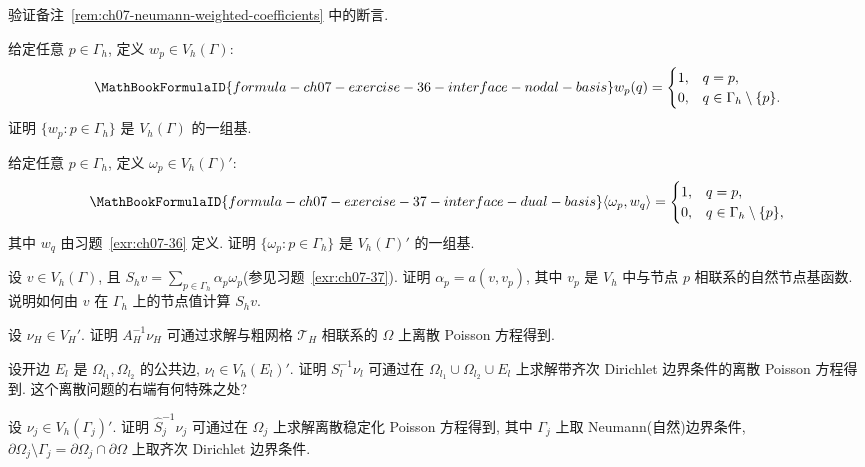 \begin{MBExercise}
\label{exr:ch07-35}
验证备注~\ref{rem:ch07-neumann-weighted-coefficients} 中的断言.
\end{MBExercise}

\begin{MBExercise}
\label{exr:ch07-36}
给定任意 $p\in\Gamma_h$, 定义 $w_p\in V_h(\Gamma)$:
\[
\MathBookFormulaID{formula-ch07-exercise-36-interface-nodal-basis}
w_p(q)=
\begin{cases}
1,&q=p,\\
0,&q\in\Gamma_h\setminus\{p\}.
\end{cases}
\]
证明 $\{w_p:p\in\Gamma_h\}$ 是 $V_h(\Gamma)$ 的一组基.
\end{MBExercise}

\begin{MBExercise}
\label{exr:ch07-37}
给定任意 $p\in\Gamma_h$, 定义 $\omega_p\in V_h(\Gamma)'$:
\[
\MathBookFormulaID{formula-ch07-exercise-37-interface-dual-basis}
\langle\omega_p,w_q\rangle=
\begin{cases}
1,&q=p,\\
0,&q\in\Gamma_h\setminus\{p\},
\end{cases}
\]
其中 $w_q$ 由习题~\ref{exr:ch07-36} 定义. 证明 $\{\omega_p:p\in\Gamma_h\}$ 是 $V_h(\Gamma)'$ 的一组基.
\end{MBExercise}

\begin{MBExercise}
\label{exr:ch07-38}
设 $v\in V_h(\Gamma)$, 且 $S_hv=\sum_{p\in\Gamma_h}\alpha_p\omega_p$(参见习题~\ref{exr:ch07-37}). 证明 $\alpha_p=a(v,v_p)$, 其中 $v_p$ 是 $V_h$ 中与节点 $p$ 相联系的自然节点基函数. 说明如何由 $v$ 在 $\Gamma_h$ 上的节点值计算 $S_hv$.
\end{MBExercise}

\begin{MBExercise}
\label{exr:ch07-39}
设 $\nu_H\in V_H'$. 证明 $A_H^{-1}\nu_H$ 可通过求解与粗网格 $\mathcal T_H$ 相联系的 $\Omega$ 上离散 Poisson 方程得到.
\end{MBExercise}

\begin{MBExercise}
\label{exr:ch07-40}
设开边 $E_l$ 是 $\Omega_{l_1},\Omega_{l_2}$ 的公共边, $\nu_l\in V_h(E_l)'$. 证明 $S_l^{-1}\nu_l$ 可通过在 $\Omega_{l_1}\cup\Omega_{l_2}\cup E_l$ 上求解带齐次 Dirichlet 边界条件的离散 Poisson 方程得到. 这个离散问题的右端有何特殊之处?
\end{MBExercise}

\begin{MBExercise}
\label{exr:ch07-41}
设 $\nu_j\in V_h(\Gamma_j)'$. 证明 $\widehat S_j^{-1}\nu_j$ 可通过在 $\Omega_j$ 上求解离散稳定化 Poisson 方程得到, 其中 $\Gamma_j$ 上取 Neumann(自然)边界条件, $\partial\Omega_j\setminus\Gamma_j=\partial\Omega_j\cap\partial\Omega$ 上取齐次 Dirichlet 边界条件.
\end{MBExercise}

